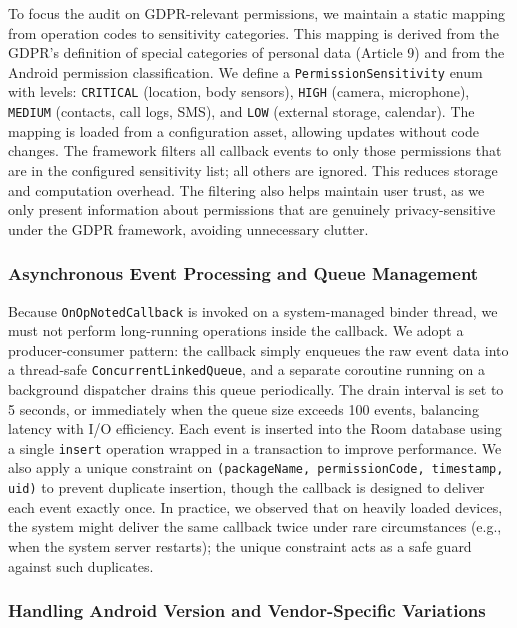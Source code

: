 To focus the audit on GDPR-relevant permissions, we maintain a static mapping from operation codes to sensitivity categories. This mapping is derived from the GDPR's definition of special categories of personal data (Article 9) and from the Android permission classification. We define a \texttt{PermissionSensitivity} enum with levels: \texttt{CRITICAL} (location, body sensors), \texttt{HIGH} (camera, microphone), \texttt{MEDIUM} (contacts, call logs, SMS), and \texttt{LOW} (external storage, calendar). The mapping is loaded from a configuration asset, allowing updates without code changes. The framework filters all callback events to only those permissions that are in the configured sensitivity list; all others are ignored. This reduces storage and computation overhead. The filtering also helps maintain user trust, as we only present information about permissions that are genuinely privacy-sensitive under the GDPR framework, avoiding unnecessary clutter.

\subsubsection{Asynchronous Event Processing and Queue Management}

Because \texttt{OnOpNotedCallback} is invoked on a system-managed binder thread, we must not perform long-running operations inside the callback. We adopt a producer-consumer pattern: the callback simply enqueues the raw event data into a thread-safe \texttt{ConcurrentLinkedQueue}, and a separate coroutine running on a background dispatcher drains this queue periodically. The drain interval is set to 5 seconds, or immediately when the queue size exceeds 100 events, balancing latency with I/O efficiency. Each event is inserted into the Room database using a single \texttt{insert} operation wrapped in a transaction to improve performance. We also apply a unique constraint on \texttt{(packageName, permissionCode, timestamp, uid)} to prevent duplicate insertion, though the callback is designed to deliver each event exactly once. In practice, we observed that on heavily loaded devices, the system might deliver the same callback twice under rare circumstances (e.g., when the system server restarts); the unique constraint acts as a safe guard against such duplicates.

\subsubsection{Handling Android Version and Vendor-Specific Variations}


